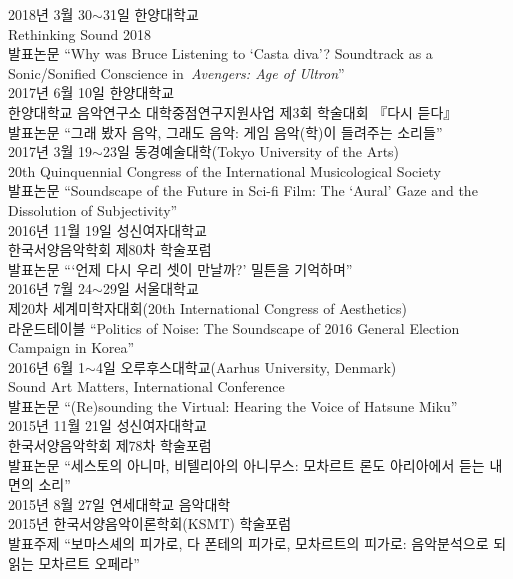 \documentclass[dvipdfmx,a4paper]{article}
\begin{document}
  \noindent 2018년 3월 30$\sim$31일 한양대학교\\
  Rethinking Sound 2018\\
  발표논문 “Why was Bruce Listening to ‘Casta diva’? Soundtrack as a Sonic/Sonified Conscience in \textit{Avengers: Age of Ultron}”\\
  
  \noindent 2017년 6월 10일 한양대학교\\
  한양대학교 음악연구소 대학중점연구지원사업 제3회 학술대회 『다시 듣다』\\
  발표논문 “그래 봤자 음악, 그래도 음악: 게임 음악(학)이 들려주는 소리들”\\
  
  \noindent 2017년 3월 19$\sim$23일 동경예술대학(Tokyo University of the Arts)\\
  20th Quinquennial Congress of the International Musicological Society\\
  발표논문 “Soundscape of the Future in Sci-fi Film: The ‘Aural’ Gaze and the Dissolution of Subjectivity”\\
  
  \noindent 2016년 11월 19일 성신여자대학교\\
  한국서양음악학회 제80차 학술포럼\\
  발표논문 “‘언제 다시 우리 셋이 만날까?’ 밀튼을 기억하며”\\
  
  \noindent 2016년 7월 24$\sim$29일 서울대학교\\
  제20차 세계미학자대회(20th International Congress of Aesthetics)\\
  라운드테이블 “Politics of Noise: The Soundscape of 2016 General Election Campaign in Korea”\\
  
  \noindent 2016년 6월 1$\sim$4일 오루후스대학교(Aarhus University, Denmark)\\
  Sound Art Matters, International Conference\\
  발표논문 “(Re)sounding the Virtual: Hearing the Voice of Hatsune Miku”\\
  
  \noindent 2015년 11월 21일 성신여자대학교\\
  한국서양음악학회 제78차 학술포럼\\
  발표논문 “세스토의 아니마, 비텔리아의 아니무스: 모차르트 론도 아리아에서 듣는 내면의 소리”\\
  
  \noindent 2015년 8월 27일 연세대학교 음악대학\\
  2015년 한국서양음악이론학회(KSMT) 학술포럼\\
  발표주제 “보마스셰의 피가로, 다 폰테의 피가로, 모차르트의 피가로: 음악분석으로 되읽는 모차르트 오페라”\\
  
\end{document}
